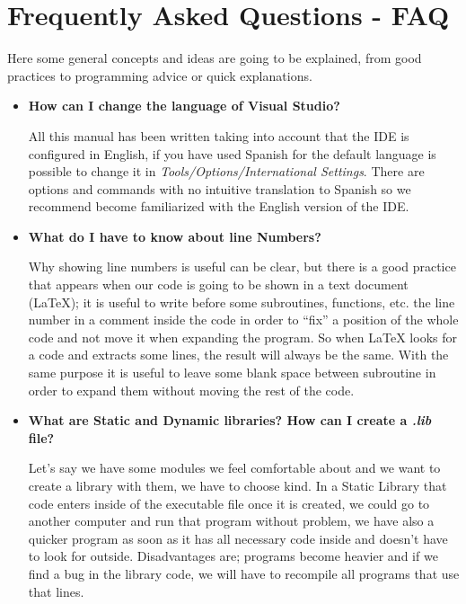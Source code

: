 \chapter{Frequently Asked Questions - FAQ}

Here some general concepts and ideas are going to be explained, from good practices to programming advice or quick explanations.

\begin{itemize}
    \item \textbf{How can I change the language of Visual Studio?}
    
    All this manual has been written taking into account that the IDE is configured in English, if you have used Spanish for the default language is possible to change it in \textit{Tools/Options/International Settings}. There are options and commands with no intuitive translation to Spanish so we recommend become familiarized with the English version of the IDE.
    
    \item \textbf{What do I have to know about line Numbers?} 
    
    Why showing line numbers is useful can be clear, but there is a good practice that appears when our code is going to be shown in a text document (\LaTeX); it is useful to write before some subroutines, functions, etc. the line number in a comment inside the code in order to ``fix'' a position of the whole code and not move it when expanding the program. So when LaTeX looks for a code and extracts some lines, the result will always be the same. With the same purpose it is useful to leave some blank space between subroutine in order to expand them without moving the rest of the code.
    
    \item \textbf{What are Static and Dynamic libraries? How can I create a \textit{.lib} file?} 
    
    Let's say we have some modules we feel comfortable about and we want to create a library with them, we have to choose kind. In a Static Library that code enters inside of the executable file once it is created, we could go to another computer and run that program without problem, we have also a quicker program as soon as it has all necessary code inside and doesn't have to look for outside. Disadvantages are; programs become heavier and if we find a bug in the library code, we will have to recompile all programs that use that lines. 
    

\end{itemize}
